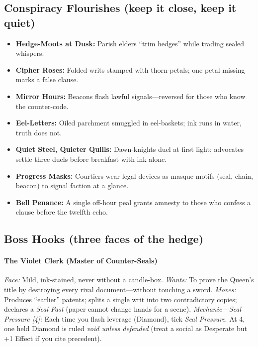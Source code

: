 \subsection*{Conspiracy Flourishes (keep it close, keep it quiet)}
\begin{itemize}
  \item \textbf{Hedge-Moots at Dusk:} Parish elders “trim hedges” while trading sealed whispers.
  \item \textbf{Cipher Roses:} Folded writs stamped with thorn-petals; one petal missing marks a false clause.
  \item \textbf{Mirror Hours:} Beacons flash lawful signals—reversed for those who know the counter-code.
  \item \textbf{Eel-Letters:} Oiled parchment smuggled in eel-baskets; ink runs in water, truth does not.
  \item \textbf{Quiet Steel, Quieter Quills:} Dawn-knights duel at first light; advocates settle three duels before breakfast with ink alone.
  \item \textbf{Progress Masks:} Courtiers wear legal devices as masque motifs (seal, chain, beacon) to signal faction at a glance.
  \item \textbf{Bell Penance:} A single off-hour peal grants amnesty to those who confess a clause before the twelfth echo.
\end{itemize}

\subsection*{Boss Hooks (three faces of the hedge)}
\paragraph*{The Violet Clerk (Master of Counter-Seals)}
\emph{Face:} Mild, ink-stained, never without a candle-box.  
\emph{Wants:} To prove the Queen’s title by destroying every rival document—without touching a sword.  
\emph{Moves:} Produces “earlier” patents; splits a single writ into two contradictory copies; declares a \emph{Seal Fast} (paper cannot change hands for a scene).  
\emph{Mechanic—Seal Pressure [4]:} Each time you flash leverage (Diamond), tick \emph{Seal Pressure}. At 4, one held Diamond is ruled \emph{void unless defended} (treat a social as Desperate but +1 Effect if you cite precedent).

